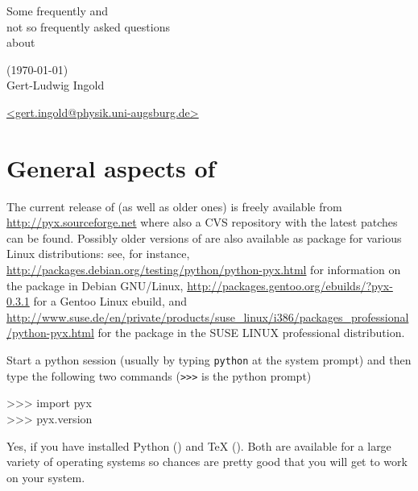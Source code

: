 \documentclass[11pt,DIV14]{scrartcl}
\begin{document}
\begin{center}
\LARGE\sffamily Some frequently and\\ 
not so frequently asked questions\\ 
about \PyX\\
\par
{\small\sffamily (\today)}\\[1truecm]
\large
Gert-Ludwig Ingold \par
\href{mailto:gert.ingold@physik.uni-augsburg.de}{\url{<gert.ingold@physik.uni-augsburg.de>}}
\end{center}
\toc
\newpage

\section{General aspects of \PyX}
{}
{The current release of \PyX{} (as well as older ones) is freely available 
from \url{http://pyx.sourceforge.net} where also a CVS repository with the 
latest patches can be found. Possibly older versions of \PyX{} are
also available as package for
various Linux distributions: see, for instance,  
\url{http://packages.debian.org/testing/python/python-pyx.html} for
information on the \PyX{} package in Debian GNU/Linux, 
\url{http://packages.gentoo.org/ebuilds/?pyx-0.3.1} for a Gentoo Linux
ebuild, and
\url{http://www.suse.de/en/private/products/suse_linux/i386/packages_professional/python-pyx.html}
for the \PyX{} package in the SUSE LINUX professional distribution.
}

{}
{Start a python session (usually by typing \texttt{python} at the system
prompt) and then type the following two commands (\texttt{>>>} is the python 
prompt)
\begin{progcode}
>>> import pyx\\
>>> pyx.\us\us{}version\us\us
\end{progcode}
}

{}
{Yes, if you have installed Python ()
and \TeX{} (). Both are available for
a large variety of operating systems so chances are pretty good that you will 
get \PyX{} to work on your system.
}
\end{document}
